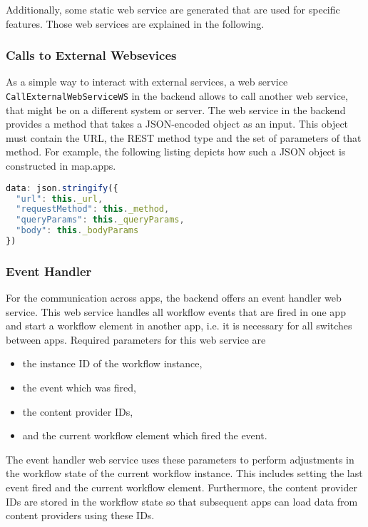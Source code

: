 Additionally, some static web service are generated that are used for specific features. Those web services are explained in the following.
\subsubsection{Calls to External Websevices}
As a simple way to interact with external services, a web service \lstinline|CallExternalWebServiceWS| in the backend allows to call another web service, that might be on a different system or server. The web service in the backend provides a method that takes a JSON-encoded object as an input. This object must contain the URL, the REST method type and the set of parameters of that method. For example, the following listing depicts how such a JSON object is constructed in map.apps.

\begin{lstlisting}[language=Javascript, label=lst:callExtWSJSON, caption=JSON-encoded object containing information to call an external web service]
data: json.stringify({
  "url": this._url,
  "requestMethod": this._method,
  "queryParams": this._queryParams,
  "body": this._bodyParams
})
\end{lstlisting}

\subsubsection{Event Handler} 

For the communication across apps, the backend offers an event handler web service. This web service handles all workflow events that are fired in one app and start a workflow element in another app, i.e. it is necessary for all switches between apps. Required parameters for this web service are

\begin{itemize}
\item the instance ID of the workflow instance,
\item the event which was fired,
\item the content provider IDs,
\item and the current workflow element which fired the event.
\end{itemize}

The event handler web service uses these parameters to perform adjustments in the workflow state of the current workflow instance. This includes setting the last event fired and the current workflow element. Furthermore, the content provider IDs are stored in the workflow state so that subsequent apps can load data from content providers using these IDs.


